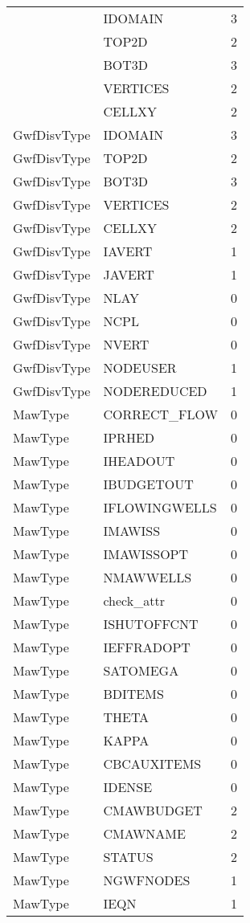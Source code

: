 \begin{longtable}{p{6cm} p{4cm} p{2cm} }
 &  IDOMAIN & 3 \\ 
 &  TOP2D & 2 \\ 
 &  BOT3D & 3 \\ 
 &  VERTICES & 2 \\ 
 &  CELLXY & 2 \\ 
GwfDisvType &  IDOMAIN & 3 \\ 
GwfDisvType &  TOP2D & 2 \\ 
GwfDisvType &  BOT3D & 3 \\ 
GwfDisvType &  VERTICES & 2 \\ 
GwfDisvType &  CELLXY & 2 \\ 
GwfDisvType &  IAVERT & 1 \\ 
GwfDisvType &  JAVERT & 1 \\ 
GwfDisvType &  NLAY & 0 \\ 
GwfDisvType &  NCPL & 0 \\ 
GwfDisvType &  NVERT & 0 \\ 
GwfDisvType &  NODEUSER & 1 \\ 
GwfDisvType &  NODEREDUCED & 1 \\ 
MawType &  CORRECT\_FLOW & 0 \\ 
MawType &  IPRHED & 0 \\ 
MawType &  IHEADOUT & 0 \\ 
MawType &  IBUDGETOUT & 0 \\ 
MawType &  IFLOWINGWELLS & 0 \\ 
MawType &  IMAWISS & 0 \\ 
MawType &  IMAWISSOPT & 0 \\ 
MawType &  NMAWWELLS & 0 \\ 
MawType &  check\_attr & 0 \\ 
MawType &  ISHUTOFFCNT & 0 \\ 
MawType &  IEFFRADOPT & 0 \\ 
MawType &  SATOMEGA & 0 \\ 
MawType &  BDITEMS & 0 \\ 
MawType &  THETA & 0 \\ 
MawType &  KAPPA & 0 \\ 
MawType &  CBCAUXITEMS & 0 \\ 
MawType &  IDENSE & 0 \\ 
MawType &  CMAWBUDGET & 2 \\ 
MawType &  CMAWNAME & 2 \\ 
MawType &  STATUS & 2 \\ 
MawType &  NGWFNODES & 1 \\ 
MawType &  IEQN & 1 \\ 

\end{longtable}
